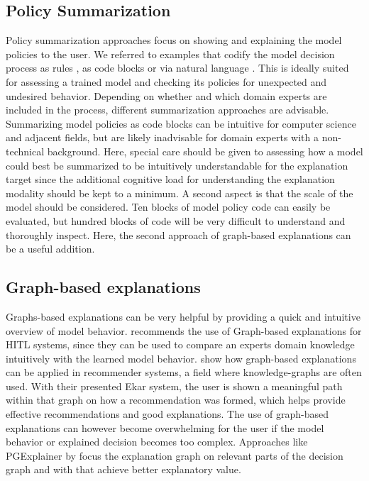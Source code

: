 \documentclass[twoside,11pt]{article}
\begin{document}
\subsection{Policy Summarization}
Policy summarization approaches focus on showing and explaining the model policies to the user. We referred to examples that codify the model decision process as rules \citep{LiuEtAl:2018:LinearModelUTrees}, as code blocks \citep{VermaEtAl:2018:ProgrammaticallyInterpretableRL} or via natural language \citep{AlonsoEtAl:2018:xAINLBeerClassifier}. 
This is ideally suited for assessing a trained model and checking its policies for unexpected and undesired behavior. Depending on whether and which domain experts are included in the process, different summarization approaches are advisable. Summarizing model policies as code blocks can be intuitive for computer science and adjacent fields, but are likely inadvisable for domain experts with a non-technical background. Here, special care should be given to assessing how a model could best be summarized to be intuitively understandable for the explanation target since the additional cognitive load for understanding the explanation modality should be kept to a minimum.
A second aspect is that the scale of the model should be considered. Ten blocks of model policy code can easily be evaluated, but hundred blocks of code will be very difficult to understand and thoroughly inspect. Here, the second approach of graph-based explanations can be a useful addition.

\subsection{Graph-based explanations}

Graphs-based explanations can be very helpful by providing a quick and intuitive overview of model behavior. \citet{Holzinger:2016:iML} recommends the use of Graph-based explanations for HITL systems, since they can be used to compare an experts domain knowledge intuitively with the learned model behavior. \citet{SongEtAl:2019:ExplainableGraphBasedRecommendations} show how graph-based explanations can be applied in recommender systems, a field where knowledge-graphs are often used. With their presented Ekar system, the user is shown a meaningful path within that graph on how a recommendation was formed, which helps provide effective recommendations and good explanations.
The use of graph-based explanations can however become overwhelming for the user if the model behavior or explained decision becomes too complex. Approaches like PGExplainer by \citep{Vu:2020:PGMExplainer} focus the explanation graph on relevant parts of the decision graph and with that achieve better explanatory value.
\end{document}
